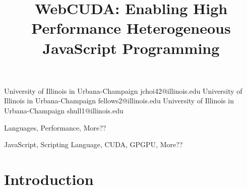 \documentclass[10pt,reprint]{sigplanconf}
\begin{document}
\setlength{\pdfpageheight}{\paperheight}
\setlength{\pdfpagewidth}{\paperwidth}




\permissiontopublish             %


\title{WebCUDA: Enabling High Performance Heterogeneous JavaScript Programming}

           {University of Illinois in Urbana-Champaign}
           {jchoi42@illinois.edu}
           {University of Illinois in Urbana-Champaign}
           {fellows2@illinois.edu}
           {University of Illinois in Urbana-Champaign}
           {shull1@illinois.edu}

\maketitle

\begin{abstract}
	
\end{abstract}


\terms
Languages, Performance, More??

\keywords
JavaScript, Scripting Language, CUDA, GPGPU, More??

\section{Introduction}
\label{intro}

\end{document}
